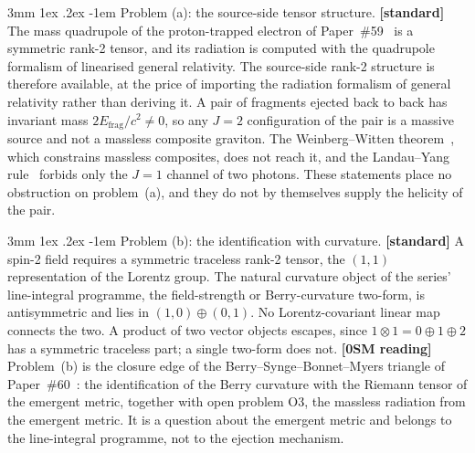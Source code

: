 \documentclass[%
 reprint, amsmath,amssymb, aps, prb, ]{revtex4-2}
\makeatletter
\numberwithin{equation}{section}
\renewcommand\paragraph{%
  \@startsection{paragraph}{4}{\z@}%
    {3mm \@plus 1ex \@minus .2ex}%
    {-1em}%
    {\normalfont\normalsize\itshape}}
\makeatother
\begin{document}
\paragraph{Problem (a): the source-side tensor structure.} \textbf{[standard]} The mass quadrupole of the proton-trapped electron of Paper~\#59~\cite{hanamura59} is a symmetric rank-2 tensor, and its radiation is computed with the quadrupole formalism of linearised general relativity. The source-side rank-2 structure is therefore available, at the price of importing the radiation formalism of general relativity rather than deriving it. A pair of fragments ejected back to back has invariant mass $2E_{\text{frag}}/c^{2} \neq 0$, so any $J = 2$ configuration of the pair is a massive source and not a massless composite graviton. The Weinberg--Witten theorem~\cite{weinberg1980}, which constrains massless composites, does not reach it, and the Landau--Yang rule~\cite{landau1948,yang1950} forbids only the $J = 1$ channel of two photons. These statements place no obstruction on problem~(a), and they do not by themselves supply the helicity of the pair.

\paragraph{Problem (b): the identification with curvature.} \textbf{[standard]} A spin-2 field requires a symmetric traceless rank-2 tensor, the $(1,1)$ representation of the Lorentz group. The natural curvature object of the series' line-integral programme, the field-strength or Berry-curvature two-form, is antisymmetric and lies in $(1,0)\oplus(0,1)$. No Lorentz-covariant linear map connects the two. A product of two vector objects escapes, since $1\otimes1 = 0\oplus1\oplus2$ has a symmetric traceless part; a single two-form does not. \textbf{[0SM reading]} Problem~(b) is the closure edge of the Berry--Synge--Bonnet--Myers triangle of Paper~\#60~\cite{hanamura60}: the identification of the Berry curvature with the Riemann tensor of the emergent metric, together with open problem O3, the massless radiation from the emergent metric. It is a question about the emergent metric and belongs to the line-integral programme, not to the ejection mechanism.
\end{document}
